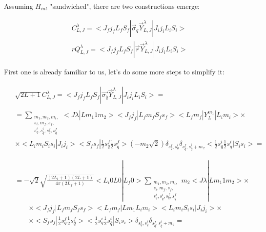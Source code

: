 Assuming $H_{int}$ "sandwiched", there are two constructions emerge:

\begin{align}
    &C_{L, J}^\lambda = <J_f j_f L_f S_f|\vec{\sigma}_{q} \vec{Y}^{\lambda}_{L, J}|J_i j_i L_i S_i> \\
    &r Q_{L, J}^\lambda = <J_f j_f L_f S_f|\vec{r} \vec{Y}^{\lambda}_{L, J}|J_i j_i L_i S_i>
\end{align}

First one is already familiar to us, let's do some more steps to simplify it:

\begin{align}
    \begin{split}
        &\sqrt{2L+1} C_{L, J}^\lambda = <J_f j_f L_f S_f| \vec{\sigma_{\overline{q}}} \vec{Y}_{L, J}^\lambda |J_i j_i L_i S_i> =
    \end{split} \\
    \begin{split}
        &= \sum_{\substack{m_1, m_2, m_i,\\ s_i, m_f, s_f,\\ s^i_{q}, s^{i}_{\overline{q}}, s^{f}_{q}, s^{f}_{\overline{q}}}} <J \lambda| L m_1 1 m_2> <J_f j_f| L_f m_f S_f s_f> <L_f m_f| Y_{L}^{m_1} |L_i m_i> \times \\
        &\times <L_i m_i S_i s_i| J_i j_i> <S_f s_f| \frac{1}{2} s^f_{q} \frac{1}{2} s^f_{\overline{q}}> (-m_2\sqrt{2}) \delta_{s^f_{q}, s^{i}_{q}} \delta_{s^f_{\overline{q}}, s^i_{\overline{q}} + m_2} <\frac{1}{2} s^i_{q} \frac{1}{2} s^i_{\overline{q}} |S_i s_i> = \\
    \end{split} \\
    \begin{split}
        &= -\sqrt{2}\sqrt{\frac{(2L_i + 1)(2L+1)}{4 \pi (2L_f + 1)}} <L_i 0 L 0 | L_f 0> \sum_{\substack{m_1, m_2, m_i,\\ s_i, m_f, s_f,\\ s^i_{q}, s^{i}_{\overline{q}}, s^{f}_{q}, s^{f}_{\overline{q}}}} m_2 <J \lambda| L m_1 1 m_2> \times\\
        &\qquad\times <J_f j_f| L_f m_f S_f s_f> <L_f m_f| L m_1 L_i m_i>  <L_i m_i S_i s_i| J_i j_i> \times\\
        &\qquad\times <S_f s_f| \frac{1}{2} s^f_{q} \frac{1}{2} s^f_{\overline{q}}> <\frac{1}{2} s^i_{q} \frac{1}{2} s^i_{\overline{q}} |S_i s_i> \delta_{s^f_{q}, s^{i}_{q}} \delta_{s^f_{\overline{q}}, s^i_{\overline{q}}+m_2} =
    \end{split} \\

\end{align}
